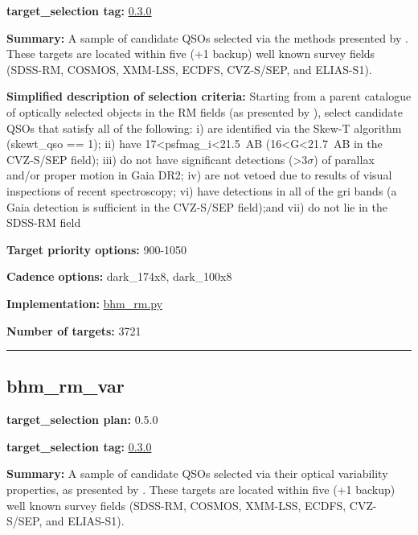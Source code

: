 \noindent\textbf{target\_selection tag:}
\href{https://github.com/sdss/target_selection/tree/0.3.0/}{0.3.0}

\noindent\textbf{Summary:} A sample of candidate QSOs selected via the methods
presented by
\citet{Yang2022}. These targets are located within five (+1 backup) well
known survey fields (SDSS-RM, COSMOS, XMM-LSS, ECDFS, CVZ-S/SEP, and
ELIAS-S1).

\noindent\textbf{Simplified description of selection criteria:} Starting from a
parent catalogue of optically selected objects in the RM fields (as
presented by
\citealt{Yang2022}), select candidate QSOs that satisfy all of the
following: i) are identified via the Skew-T algorithm (skewt\_qso == 1);
ii) have 17\textless{}psfmag\_i\textless{}21.5~AB
(16\textless{}G\textless{}21.7~AB in the CVZ-S/SEP field); iii) do not
have significant detections (\textgreater{}3$\sigma$) of parallax and/or proper
motion in Gaia DR2; iv) are not vetoed due to results of visual
inspections of recent spectroscopy; vi) have detections in all of the
gri bands (a Gaia detection is sufficient in the CVZ-S/SEP field);and
vii) do not lie in the SDSS-RM field


\noindent\textbf{Target priority options:} 900-1050

\noindent\textbf{Cadence options:} dark\_174x8, dark\_100x8

\noindent\textbf{Implementation:}
\href{https://github.com/sdss/target_selection/blob/0.3.0/python/target_selection/cartons/bhm_rm.py}{bhm\_rm.py}

\noindent\textbf{Number of targets:} 3721

\begin{center}\rule{0.5\linewidth}{0.5pt}\end{center}

\hypertarget{bhm_rm_var_plan0.5.0}{%
\subsection{bhm\_rm\_var}\label{bhm_rm_var_plan0.5.0}}

\noindent\textbf{target\_selection plan:} 0.5.0

\noindent\textbf{target\_selection tag:}
\href{https://github.com/sdss/target_selection/tree/0.3.0/}{0.3.0}

\noindent\textbf{Summary:} A sample of candidate QSOs selected via their optical
variability properties, as presented by
\citet{Yang2022}. These targets are located within five (+1 backup) well
known survey fields (SDSS-RM, COSMOS, XMM-LSS, ECDFS, CVZ-S/SEP, and
ELIAS-S1).

